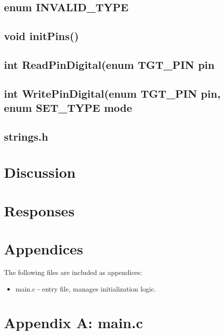 \documentclass[letterpaper,11pt]{texMemo} %
\begin{document}
\subsection*{enum INVALID_TYPE}
\subsection*{void initPins()}
\subsection*{int ReadPinDigital(enum TGT_PIN pin}
\subsection*{int WritePinDigital(enum TGT_PIN pin, enum SET_TYPE mode}
\subsection*{strings.h}

\section*{Discussion}


\newpage
\section*{Responses}


\section*{Appendices}
The following files are included as appendices:
\begin{itemize}
\item main.c - entry file, manages initialization logic.
\end{itemize}
\newpage

\section*{Appendix A: main.c}
\begin{tiny}

\end{tiny}
\newpage
\end{document}
